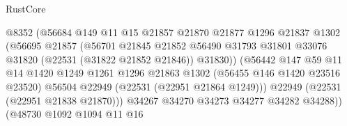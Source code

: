 \begin{lexlean}{RustCore}
\begin{coremodule}
                                        @8352
                                        (@56684
                                          @149
                                          @11
                                          @15
                                          @21857
                                          @21870
                                          @21877
                                          @1296
                                          @21837
                                          @1302
                                          (@56695
                                            @21857
                                            (@56701
                                              @21845
                                              @21852
                                              @56490
                                              @31793
                                              @31801
                                              @33076
                                              @31820
                                              (@22531 (@31822 @21852 @21846))
                                              @31830))
                                          (@56442
                                            @147
                                            @59
                                            @11
                                            @14
                                            @1420
                                            @1249
                                            @1261
                                            @1296
                                            @21863
                                            @1302
                                            (@56455 @146 @1420 @23516 @23520)
                                            @56504
                                            @22949
                                            (@22531 (@22951 @21864 @1249)))
                                          @22949
                                          (@22531 (@22951 @21838 @21870)))
                                        @34267
                                        @34270
                                        @34273
                                        @34277
                                        @34282
                                        @34288))
                                    (@48730
                                      @1092
                                      @1094
                                      @11
                                      @16

\end{coremodule}
\end{lexlean}
